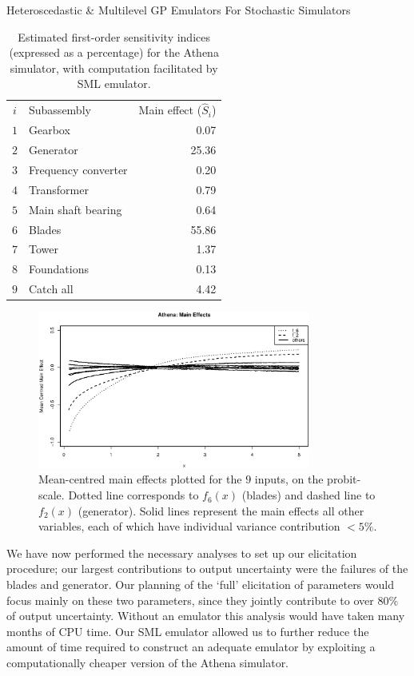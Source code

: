 \begin{chapter}{Heteroscedastic \& Multilevel GP Emulators For Stochastic Simulators\label{Ch:Hetsml}}
\begin{table}[h]
\begin{tabular}{@{}clr@{}}
    \toprule

	$i$ & Subassembly & Main effect ($\hat{S}_i$)\\\cmidrule{1-3}
	$1$ & Gearbox & 0.07\\
	$2$ & Generator & 25.36\\
	$3$ & Frequency converter & 0.20\\
	$4$ & Transformer & 0.79\\
	$5$ & Main shaft bearing & 0.64\\
	$6$ & Blades & 55.86\\
	$7$ & Tower & 1.37\\
	$8$ & Foundations & 0.13\\
	$9$ & Catch all & 4.42\\\bottomrule
  \end{tabular}
	\caption{Estimated first-order sensitivity indices (expressed as a percentage) for the Athena simulator, with computation facilitated by SML emulator.}
\label{Table:first-order}
\end{table}
\begin{figure}[h]
\centering
\includegraphics[width=0.8\textwidth]{sml-het-fig/main-eff-mono.eps}
\caption{Mean-centred main effects plotted for the $9$ inputs, on the probit-scale. Dotted line corresponds to $f_6(x)$ (blades) and dashed line to $f_2(x)$ (generator). Solid lines represent the main effects all other variables, each of which have individual variance contribution $<5\%$.}
\label{Fig:main-effs}
\end{figure}

We have now performed the necessary analyses to set up our elicitation procedure; our largest contributions to output uncertainty were the failures of the blades and generator. Our planning of the `full' elicitation of parameters would focus mainly on these two parameters, since they jointly contribute to over $80\%$ of output uncertainty. Without an emulator this analysis would have taken many months of CPU time. Our SML emulator allowed us to further reduce the amount of time required to construct an adequate emulator by exploiting a computationally cheaper version of the Athena simulator.

\end{chapter}
